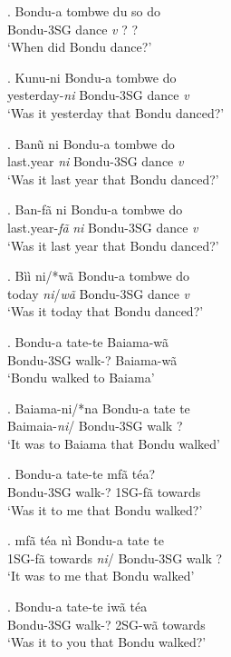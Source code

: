 \documentclass{assets/fieldnotes}
\begin{document}
\exg. Bondu-a tombwe du so do\\
Bondu-3SG dance \textit{v} ? ?\\
`When did Bondu dance?'

\exg. Kunu-ni Bondu-a tombwe do\\
yesterday-\textit{ni} Bondu-3SG dance \textit{v}\\
`Was it yesterday that Bondu danced?'

\exg. Banũ ni Bondu-a tombwe do\\
last.year \textit{ni} Bondu-3SG dance \textit{v}\\
`Was it last year that Bondu danced?'

\exg. Ban-fã ni Bondu-a tombwe do\\
last.year-\textit{fã} \textit{ni} Bondu-3SG dance \textit{v}\\
`Was it last year that Bondu danced?'

\exg. Bìì ni/*wã Bondu-a tombwe do\\
today \textit{ni}/\textit{wã} Bondu-3SG dance \textit{v}\\
`Was it today that Bondu danced?'

\exg. Bondu-a tate-te Baiama-wã\\
Bondu-3SG walk-? Baiama-wã\\
`Bondu walked to Baiama'

\exg. Baiama-ni/*na Bondu-a tate te\\
Baimaia-\textit{ni}/ Bondu-3SG walk ?\\
`It was to Baiama that Bondu walked'

\exg. Bondu-a tate-te mfã téa?\\
Bondu-3SG walk-? 1SG-fã towards\\
`Was it to me that Bondu walked?'

\exg. mfã téa nì Bondu-a tate te\\
1SG-fã towards \textit{ni}/ Bondu-3SG walk ?\\
`It was to me that Bondu walked'

\exg. Bondu-a tate-te iwã téa\\
Bondu-3SG walk-? 2SG-wã towards\\
`Was it to you that Bondu walked?'
\end{document}
